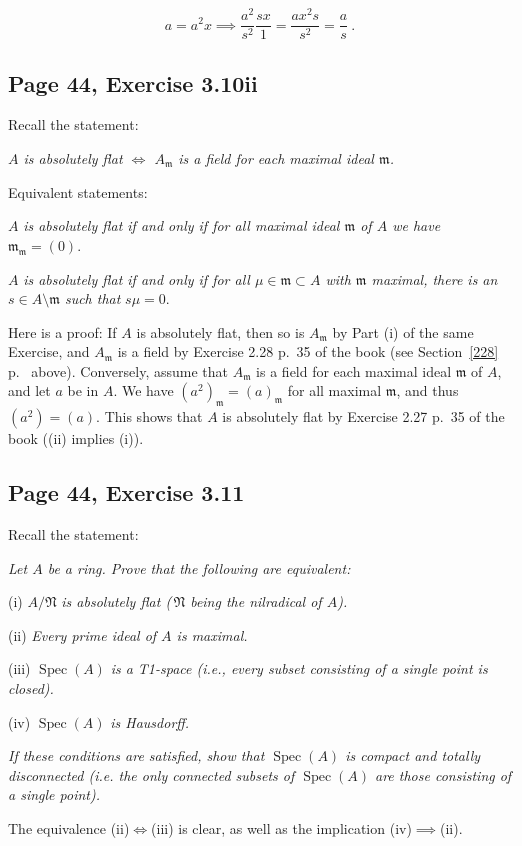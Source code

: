 \documentclass[parskip=half,fontsize=12pt]{scrartcl}%
\newcommand{\mf}{\mathfrak}
\newcommand{\mmm}{\mf m}
\newcommand{\Spec}{\operatorname{Spec}}\newcommand{\Sp}{\operatorname{Spec}}
\begin{document}
$$a=a^2x\implies\frac{a^2}{s^2}\frac{sx}1=\frac{ax^2s}{s^2}=\frac as\ .$$ 

\subsection{Page 44, Exercise 3.10ii}\label{310ii}%

Recall the statement: 

\emph{$A$ is absolutely flat $\iff$ $A_\mmm$ is a field for each maximal ideal $\mmm$.}

Equivalent statements: 

$A$ \emph{is absolutely flat if and only if for all maximal ideal $\mf m$ of $A$ we have} $\mf m_{\mf m}=(0)$.

$A$ \emph{is absolutely flat if and only if for all $\mu\in\mf m\subset A$ with $\mf m$ maximal, there is an $s\in A\setminus\mf m$ such that} $s\mu=0$.

Here is a proof: If $A$ is absolutely flat, then so is $A_{\mf m}$ by Part (i) of the same Exercise, and $A_{\mf m}$ is a field by Exercise 2.28 p.~35 of the book (see Section~\ref{228} p.~\pageref{228} above). Conversely, assume that $A_{\mf m}$ is a field for each maximal ideal $\mf m$ of $A$, and let $a$ be in $A$. We have $(a^2)_{\mf m}=(a)_{\mf m}$ for all maximal $\mf m$, and thus $(a^2)=(a)$. This shows that $A$ is absolutely flat by Exercise 2.27 p.~35 of the book ((ii) implies (i)).

\subsection{Page 44, Exercise 3.11}%

Recall the statement:

\emph{Let $A$ be a ring. Prove that the following are equivalent:}

(i) $A/\mf N$ \emph{is absolutely flat ($\,\mf N$ being the nilradical of $A$).}

(ii) \emph{Every prime ideal of $A$ is maximal.}

(iii)  $\Spec(A)$ \emph{is a T1-space (i.e., every subset consisting of a single point is closed).}

(iv) $\Spec(A)$ \emph{is Hausdorff.}

\emph{If these conditions are satisfied, show that $\Spec(A)$ is compact and totally disconnected (i.e. the only connected subsets of $\Spec(A)$ are those consisting of a single point).}

The equivalence (ii)$\iff$(iii) is clear, as well as the implication (iv)$\implies$(ii).
\end{document}

